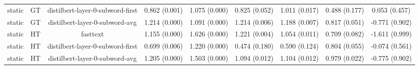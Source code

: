 \begin{sidewaystable}[htb]
\begin{tabular}{@{}ccccccccc@{}}
        static & GT & distilbert-layer-0-subword-first & 0.862 (0.001) & 1.075 (0.000) & 0.825 (0.052) & 1.011 (0.017) & 0.488 (0.177) & 0.053 (0.457) \\
        static & GT & distilbert-layer-0-subword-avg & 1.214 (0.000) & 1.091 (0.000) & 1.214 (0.006) & 1.188 (0.007) & 0.817 (0.051) & -0.771 (0.902) \\
        static & HT & fasttext & 1.155 (0.000) & 1.626 (0.000) & 1.221 (0.004) & 1.054 (0.011) & 0.709 (0.082) & -1.611 (0.999) \\
        static & HT & distilbert-layer-0-subword-first & 0.699 (0.006) & 1.220 (0.000) & 0.474 (0.180) & 0.590 (0.124) & 0.804 (0.055) & -0.074 (0.561) \\
        static & HT & distilbert-layer-0-subword-avg & 1.205 (0.000) & 1.503 (0.000) & 1.094 (0.012) & 1.104 (0.012) & 0.979 (0.022) & -0.775 (0.902) \\
        \bottomrule
    \end{tabular}
\end{sidewaystable}